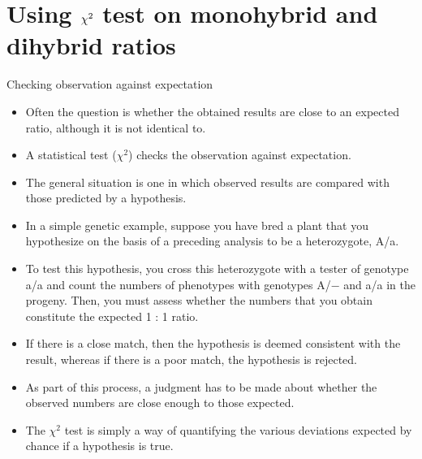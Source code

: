 \documentclass[11pt,ignorenonframetext,aspectratio=169]{beamer}
\providecommand{\tightlist}{%
  \setlength{\itemsep}{0pt}\setlength{\parskip}{0pt}}
\begin{document}
\hypertarget{using-large-chi2-test-on-monohybrid-and-dihybrid-ratios}{%
\section{\texorpdfstring{Using \(\Large \chi^2\) test on monohybrid and
dihybrid
ratios}{Using \textbackslash Large \textbackslash chi\^{}2 test on monohybrid and dihybrid ratios}}\label{using-large-chi2-test-on-monohybrid-and-dihybrid-ratios}}

\begin{frame}{Checking observation against expectation}
\protect\hypertarget{checking-observation-against-expectation}{}
\small

\begin{itemize}
\tightlist
\item
  Often the question is whether the obtained results are close to an
  expected ratio, although it is not identical to.
\item
  A statistical test (\(\chi^2\)) checks the observation against
  expectation.
\item
  The general situation is one in which observed results are compared
  with those predicted by a hypothesis.
\item
  In a simple genetic example, suppose you have bred a plant that you
  hypothesize on the basis of a preceding analysis to be a heterozygote,
  A/a.
\item
  To test this hypothesis, you cross this heterozygote with a tester of
  genotype a/a and count the numbers of phenotypes with genotypes A/−
  and a/a in the progeny. Then, you must assess whether the numbers that
  you obtain constitute the expected 1 : 1 ratio.
\item
  If there is a close match, then the hypothesis is deemed consistent
  with the result, whereas if there is a poor match, the hypothesis is
  rejected.
\item
  As part of this process, a judgment has to be made about whether the
  observed numbers are close enough to those expected.
\item
  The \(\chi^2\) test is simply a way of quantifying the various
  deviations expected by chance if a hypothesis is true.
\end{itemize}
\end{frame}
\end{document}
